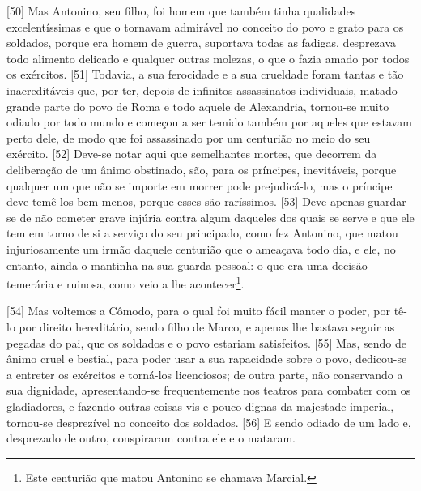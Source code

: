 {[}50{]} Mas Antonino, seu filho, foi homem que também tinha qualidades
excelentíssimas e que o tornavam admirável no conceito do povo e grato
para os soldados, porque era homem de guerra, suportava todas as
fadigas, desprezava todo alimento delicado e qualquer outras molezas, o
que o fazia amado por todos os exércitos. {[}51{]} Todavia, a sua
ferocidade e a sua crueldade foram tantas e tão inacreditáveis que, por
ter, depois de infinitos assassinatos individuais, matado grande parte
do povo de Roma e todo aquele de Alexandria, tornou-se muito odiado por
todo mundo e começou a ser temido também por aqueles que estavam perto
dele, de modo que foi assassinado por um centurião no meio do seu
exército. {[}52{]} Deve-se notar aqui que semelhantes mortes, que
decorrem da deliberação de um ânimo obstinado, são, para os príncipes,
inevitáveis, porque qualquer um que não se importe em morrer pode
prejudicá-lo, mas o príncipe deve temê-los bem menos, porque esses são
raríssimos. {[}53{]} Deve apenas guardar-se de não cometer grave injúria
contra algum daqueles dos quais se serve e que ele tem em torno de si a
serviço do seu principado, como fez Antonino, que matou injuriosamente
um irmão daquele centurião que o ameaçava todo dia, e ele, no entanto,
ainda o mantinha na sua guarda pessoal: o que era uma decisão temerária
e ruinosa, como veio a lhe acontecer\footnote{Este centurião que matou
  Antonino se chamava Marcial.}.

{[}54{]} Mas voltemos a Cômodo, para o qual foi muito fácil manter o
poder, por tê-lo por direito hereditário, sendo filho de Marco, e apenas
lhe bastava seguir as pegadas do pai, que os soldados e o povo estariam
satisfeitos. {[}55{]} Mas, sendo de ânimo cruel e bestial, para poder
usar a sua rapacidade sobre o povo, dedicou-se a entreter os exércitos e
torná-los licenciosos; de outra parte, não conservando a sua dignidade,
apresentando-se frequentemente nos teatros para combater com os
gladiadores, e fazendo outras coisas vis e pouco dignas da majestade
imperial, tornou-se desprezível no conceito dos soldados. {[}56{]} E
sendo odiado de um lado e, desprezado de outro, conspiraram contra ele e
o mataram.

